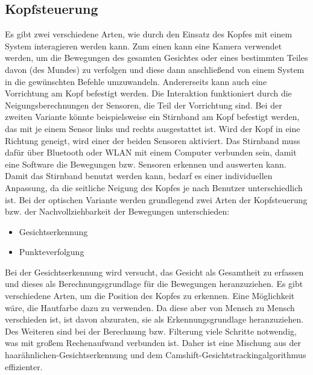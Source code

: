 \subsection{Kopfsteuerung}

Es gibt zwei verschiedene Arten, wie durch den Einsatz des Kopfes mit einem System interagieren werden kann. Zum einen kann eine Kamera verwendet werden, um die Bewegungen des gesamten Gesichtes oder eines bestimmten Teiles davon (\zB des Mundes) zu verfolgen und diese dann anschließend von einem System in die gewünschten Befehle umzuwandeln. Andererseits kann auch eine Vorrichtung am Kopf befestigt werden. Die Interaktion funktioniert durch die Neigungsberechnungen der Sensoren, die Teil der Vorrichtung sind.
\newline \newline
Bei der zweiten Variante könnte beispielsweise ein Stirnband am Kopf befestigt werden, das mit je einem Sensor links und rechts ausgestattet ist. Wird der Kopf in eine Richtung geneigt, wird einer der beiden Sensoren aktiviert. Das Stirnband muss dafür über Bluetooth oder WLAN mit einem Computer verbunden sein, damit eine Software die Bewegungen bzw. Sensoren erkennen und auswerten kann. Damit das Stirnband benutzt werden kann, bedarf es einer individuellen Anpassung, da die seitliche Neigung des Kopfes je nach Benutzer unterschiedlich ist.
\newline \newline
Bei der optischen Variante werden grundlegend zwei Arten der Kopfsteuerung bzw. der Nachvollziehbarkeit der Bewegungen unterschieden:
\begin{itemize}
      \item Gesichtserkennung
      \item Punkteverfolgung
\end{itemize}
\vspace{\baselineskip}
Bei der Gesichtserkennung wird versucht, das Gesicht als Gesamtheit zu erfassen und dieses als Berechnungsgrundlage für die Bewegungen heranzuziehen. Es gibt verschiedene Arten, um die Position des Kopfes zu erkennen. Eine Möglichkeit wäre, die Hautfarbe dazu zu verwenden. Da diese aber von Mensch zu Mensch verschieden ist, ist davon abzuraten, sie als Erkennungsgrundlage heranzuziehen. Des Weiteren sind bei der Berechnung bzw. Filterung viele Schritte notwendig, was mit großem Rechenaufwand verbunden ist. Daher ist eine Mischung aus der haarähnlichen-Gesichtserkennung und dem Camshift-Gesichtstrackingalgorithmus effizienter.
